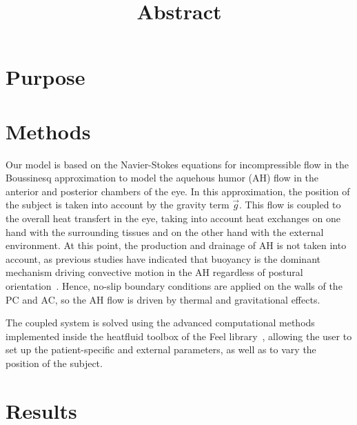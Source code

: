 \documentclass[a4paper]{article}
\title{Abstract}
\newcommand{\fpp}{Feel\nolinebreak\hspace{-.05em}\raisebox{.4ex}{\tiny\bf +}\nolinebreak\hspace{-.10em}\raisebox{.4ex}{\tiny\bf +}}
\begin{document}
\renewcommand{\thefootnote}{\fnsymbol{footnote}} %


\maketitle


\section*{Purpose}




\section*{Methods}

Our model is based on the Navier-Stokes equations for incompressible flow in the Boussinesq approximation to model the aquehous humor (AH) flow in the anterior and posterior chambers of the eye.
In this approximation, the position of the subject is taken into account by the gravity term $\vec{g}$.
This flow is coupled to the overall heat transfert in the eye, taking into account heat exchanges on one hand with the surrounding tissues and on the other hand with the external environment.
At this point, the production and drainage of AH is not taken into account, as previous studies have indicated that buoyancy is the dominant
mechanism driving convective motion in the AH regardless of postural orientation~\cite{ooi_simulation_2008}.
Hence, no-slip boundary conditions are applied on the walls of the PC and AC, so the AH flow is driven by thermal and gravitational effects.

The coupled system is solved using the advanced computational methods implemented inside the heatfluid toolbox of the \fpp{} library~\cite{prudhomme_feelppfeelpp_2024}, allowing the user to set up the patient-specific and external parameters, as well as to vary the position of the subject.



\section*{Results}
\end{document}
